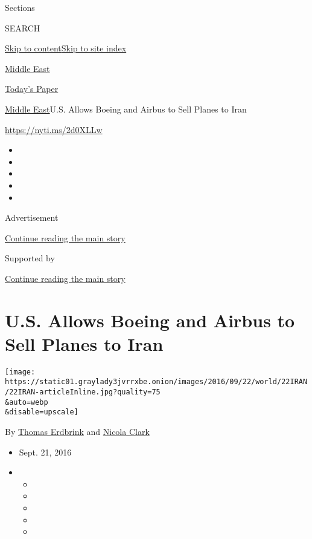 Sections

SEARCH

\protect\hyperlink{site-content}{Skip to
content}\protect\hyperlink{site-index}{Skip to site index}

\href{https://www.nytimes3xbfgragh.onion/section/world/middleeast}{Middle
East}

\href{https://myaccount.nytimes3xbfgragh.onion/auth/login?response_type=cookie\&client_id=vi}{}

\href{https://www.nytimes3xbfgragh.onion/section/todayspaper}{Today's
Paper}

\href{/section/world/middleeast}{Middle East}\textbar{}U.S. Allows
Boeing and Airbus to Sell Planes to Iran

\url{https://nyti.ms/2d0XLLw}

\begin{itemize}
\item
\item
\item
\item
\item
\end{itemize}

Advertisement

\protect\hyperlink{after-top}{Continue reading the main story}

Supported by

\protect\hyperlink{after-sponsor}{Continue reading the main story}

\hypertarget{us-allows-boeing-and-airbus-to-sell-planes-to-iran}{%
\section{U.S. Allows Boeing and Airbus to Sell Planes to
Iran}\label{us-allows-boeing-and-airbus-to-sell-planes-to-iran}}

\texttt{[image: https://static01.graylady3jvrrxbe.onion/images/2016/09/22/world/22IRAN/22IRAN-articleInline.jpg?quality=75\\\&auto=webp\\\&disable=upscale]}

By \href{http://www.nytimes3xbfgragh.onion/by/thomas-erdbrink}{Thomas
Erdbrink} and
\href{http://www.nytimes3xbfgragh.onion/by/nicola-clark}{Nicola Clark}

\begin{itemize}
\item
  Sept. 21, 2016
\item
  \begin{itemize}
  \item
  \item
  \item
  \item
  \item
  \end{itemize}
\end{itemize}

